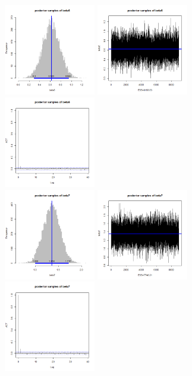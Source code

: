 \documentclass{article}
\begin{document}
\begin{figure}[!h]
    \centering
    \includegraphics[width=4cm]{beta6_hist.png}
    \includegraphics[width=4cm]{beta6_traceplot.png}
    \includegraphics[width=4cm]{beta6_acf.png} \\
    \includegraphics[width=4cm]{beta7_hist.png}
    \includegraphics[width=4cm]{beta7_traceplot.png}
    \includegraphics[width=4cm]{beta7_acf.png} \\

\end{figure}
\end{document}
